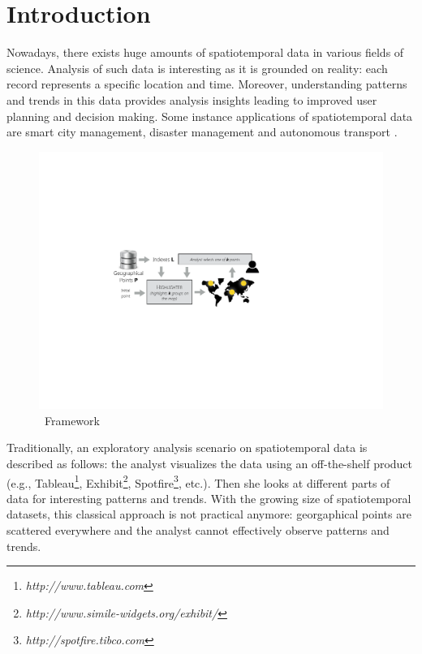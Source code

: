 \section{Introduction} 
Nowadays, there exists huge amounts of spatiotemporal data in various fields of science.
Analysis of such data is interesting as it is grounded
on reality: each record represents a specific location and time. Moreover, understanding patterns and trends in this data provides analysis insights leading to improved user planning and decision making. Some instance applications of spatiotemporal data are smart city management, disaster management and autonomous transport \cite{RoddickEHPS04,Telang:2012}.

\begin{figure}[t]
  \centering
  \includegraphics[width=\columnwidth]{figs/framework}
\caption{\framework\ Framework}
\label{fig:framework}
\end{figure}

Traditionally, an exploratory analysis scenario on spatiotemporal data is described as follows: the analyst visualizes the data using an off-the-shelf product (e.g., Tableau\footnote{\it http://www.tableau.com}, Exhibit\footnote{\it http://www.simile-widgets.org/exhibit/}, Spotfire\footnote{\it http://spotfire.tibco.com}, etc.). Then she looks at different parts of data for interesting patterns and trends. With the growing size of spatiotemporal datasets, this classical approach is not practical anymore: georgaphical points are scattered everywhere and the analyst cannot effectively observe patterns and trends.

